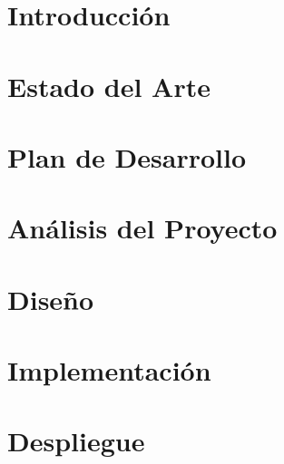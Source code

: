 \documentclass[openright,twoside,10pt]{book}
\begin{document}
\renewcommand\listtablename{Índice de Tablas}
\listoftables %
\clearpage

\chapter{Introducción}\label{cap.introduccion}


\chapter{Estado del Arte}\label{cap.arte}


\chapter{Plan de Desarrollo}\label{cap.desarrollo}


\chapter{Análisis del Proyecto}\label{cap.analisis}


\chapter{Diseño}
\label{cap.diseño}


\chapter{Implementación}\label{cap.implementation}


\chapter{Despliegue}\label{cap.deploy}



\appendix

%
%
\end{document}

